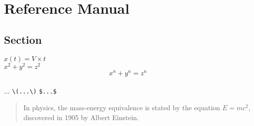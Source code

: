 \chapter{Reference Manual}
\section{Section}
$x(t) = V \times t$ \\
\(x^2 + y^2 = z^2\) \\
\[ x^n + y^n = z^n \] \\
\begin{math}...\end{math}
\noindent
\verb|\(...\)|
\texttt{\$...\$}
\begin{quote}
In physics, the mass-energy equivalence is stated 
by the equation \(E=mc^2\), discovered in 1905 by Albert Einstein.
\end{quote}

